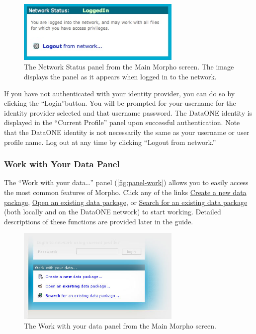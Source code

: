 \begin{figure}
  \centering
    \includegraphics[width=0.7\textwidth]{images/panel-network-status-logged-in.jpg}
  \caption{The Network Status panel from the Main Morpho screen. The
    image displays the panel as it appears when logged in to the network.}
  \label{fig:panel-network-status-logged-in}
\end{figure}

If you have not authenticated with your identity provider, you can do so 
by clicking the ``Login''button. 
You will be prompted for your username for the identity provider selected and 
that username password. The DataONE identity is displayed in the
``Current Profile'' panel upon successful authentication. Note that the DataONE identity is not necessarily
the same as your username or user profile name. Log out at any time by clicking 
``Logout from network.''

\subsubsection[Work with your data\ldots]{Work with Your Data Panel}
\label{sec:panel-work}

The ``Work with your data\ldots'' panel (\autoref{fig:panel-work})
allows you to easily access the most common features of Morpho. Click
any of the links \hyperref[sec:creating]{Create a new data package},
\hyperref[sec:viewing]{Open an existing data package}, or
\hyperref[sec:searching]{Search for an existing data package} (both
locally and on the DataONE network) to start working. Detailed descriptions
of these functions are provided later in the guide.

\begin{figure}
  \centering
    \includegraphics[width=0.7\textwidth]{images/panel-work.jpg}
  \caption{The Work with your data panel from the Main Morpho screen.}
  \label{fig:panel-work}
\end{figure}


